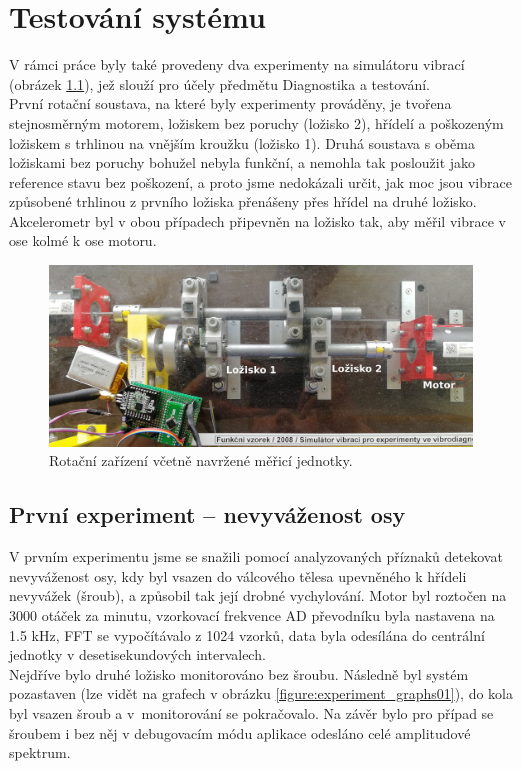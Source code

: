 \chapter{Testování systému}
    V rámci práce byly také provedeny dva experimenty na simulátoru vibrací (obrázek \ref{figure:motor}), jež slouží pro účely předmětu Diagnostika a testování.\\
    První rotační soustava, na které byly experimenty prováděny, je tvořena stejnosměrným motorem, ložiskem bez poruchy (ložisko 2), hřídelí a poškozeným ložiskem s trhlinou na vnějším kroužku (ložisko 1). Druhá soustava s oběma ložiskami bez poruchy bohužel nebyla funkční, a nemohla tak posloužit jako reference stavu bez poškození, a proto jsme nedokázali určit, jak moc jsou vibrace způsobené trhlinou z prvního ložiska přenášeny přes hřídel na druhé ložisko.\\
    Akcelerometr byl v obou případech připevněn na ložisko tak, aby měřil vibrace v ose kolmé k ose motoru.

     \begin{figure}[!ht]
            \centering
    	    \includegraphics[width =\textwidth]{Experiment/Figs/soustava_best.jpg}
            \caption {Rotační zařízení včetně navržené měřicí jednotky.}
            \label{figure:motor}
    \end{figure}  
    \section{První experiment – nevyváženost osy}
        V prvním experimentu jsme se snažili pomocí analyzovaných příznaků detekovat nevyváženost osy, kdy byl vsazen do válcového tělesa upevněného k hřídeli nevyvážek (šroub), a způsobil tak její drobné vychylování.
        Motor byl roztočen na 3000 otáček za minutu, vzorkovací frekvence AD převodníku byla nastavena na 1.5 kHz, FFT se vypočítávalo z 1024 vzorků, data byla odesílána do centrální jednotky v desetisekundových intervalech.\\
        Nejdříve bylo druhé ložisko monitorováno bez šroubu. Následně byl systém pozastaven (lze vidět na grafech v obrázku \ref{figure:experiment_graphs01}), do kola byl vsazen šroub a v~monitorování se pokračovalo. Na závěr bylo pro případ se šroubem i bez něj v debugovacím módu aplikace odesláno celé amplitudové spektrum.
        
